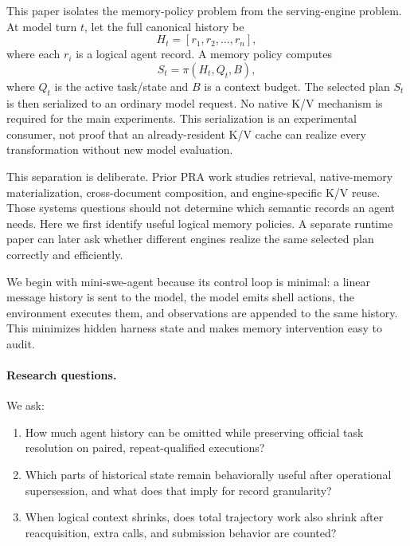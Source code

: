 \documentclass[11pt]{article}
\begin{document}
This paper isolates the memory-policy problem from the serving-engine problem.
At model turn $t$, let the full canonical history be
\[
H_t = [r_1,r_2,\ldots,r_n],
\]
where each $r_i$ is a logical agent record. A memory policy computes
\[
S_t = \pi(H_t,Q_t,B),
\]
where $Q_t$ is the active task/state and $B$ is a context budget. The selected
plan $S_t$ is then serialized to an ordinary model request. No native K/V
mechanism is required for the main experiments.  This serialization is an
experimental consumer, not proof that an already-resident K/V cache can realize
every transformation without new model evaluation.

This separation is deliberate. Prior PRA work studies retrieval, native-memory
materialization, cross-document composition, and engine-specific K/V reuse.
Those systems questions should not determine which semantic records an agent
needs. Here we first identify useful logical memory policies. A separate runtime
paper can later ask whether different engines realize the same selected plan
correctly and efficiently.

We begin with mini-swe-agent because its control loop is minimal: a linear
message history is sent to the model, the model emits shell actions, the
environment executes them, and observations are appended to the same history.
This minimizes hidden harness state and makes memory intervention easy to audit.

\paragraph{Research questions.}
We ask:
\begin{enumerate}[leftmargin=*]
    \item How much agent history can be omitted while preserving official task
    resolution on paired, repeat-qualified executions?
    \item Which parts of historical state remain behaviorally useful after
    operational supersession, and what does that imply for record granularity?
    \item When logical context shrinks, does total trajectory work also shrink
    after reacquisition, extra calls, and submission behavior are counted?
\end{enumerate}
\end{document}
